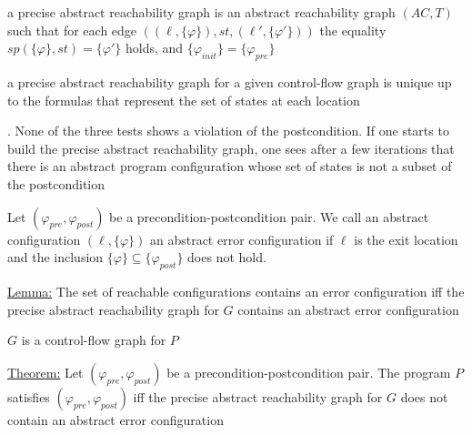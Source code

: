 \documentclass[landscape, a4paper]{article}
\begin{document}
\begin{minipage}[t]{0.2\linewidth}
\begin{betterlist}
\begin{betterlist}
			\begin{betterlist}
				\item {}
			\end{betterlist}
		\end{betterlist}
		\item \color{orange}a \alert{precise abstract reachability graph} is an abstract reachability graph $(AC, T)$ such that for each edge $((\ell, \{\varphi\}), st, (\ell', \{\varphi'\}))$ the equality $sp(\{\varphi\}, st) = \{\varphi'\}$ holds, and $\{\varphi_{init}\} = \{\varphi_{pre}\}$\color{black}
		\begin{betterlist}
			\item a precise abstract reachability graph for a given control-flow graph is unique up to the formulas that represent the set of states at each location
			\item {}. None of the three tests shows a violation of the postcondition. If one starts to build the precise abstract reachability graph, one sees after a few iterations that there is an abstract program configuration whose set of states is not a subset of the postcondition
			\item \script{363}{Algorithm}
			\begin{betterlist}
				\item \script{364}{Modifications}
			\end{betterlist}
		\end{betterlist}
		\item \color{orange}Let $(\varphi_{pre}, \varphi_{post})$ be a precondition-postcondition pair. We call an abstract configuration $(\ell, \{\varphi\})$ an \alert{abstract error configuration} if $\ell$ is the exit location and the inclusion $\{\varphi\} \subseteq \{\varphi_{post}\}$ does not hold. \color{black}
		\item \underline{Lemma:} The set of reachable configurations contains an error configuration \alert{iff} the precise abstract reachability graph for $G$ contains an abstract error configuration
		\begin{betterlist}
			\item $G$ is a control-flow graph for $P$
		\end{betterlist}
		\item \underline{Theorem:} Let $(\varphi_{pre}, \varphi_{post})$ be a precondition-postcondition pair. The program $P$ satisfies $(\varphi_{pre}, \varphi_{post})$ iff the precise abstract reachability graph for $G$ does not contain an abstract error configuration

\end{betterlist}
\end{minipage}
\end{document}
